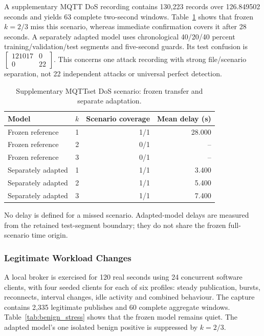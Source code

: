 \documentclass[conference]{IEEEtran}
\begin{document}
A supplementary MQTT DoS recording contains 130,223 records over
126.849502 seconds and yields 63 complete two-second windows.
Table~\ref{tab:external} shows that frozen $k=2/3$ miss this scenario,
whereas immediate confirmation covers it after 28 seconds.
A separately adapted model uses chronological 40/20/40 percent
training/validation/test segments and five-second guards. Its test
confusion is $[\begin{smallmatrix}121017&0\\0&22\end{smallmatrix}]$.
This concerns one attack recording with strong file/scenario
separation, not 22 independent attacks or universal perfect detection.

\begin{table}[t]
\centering
\caption{Supplementary MQTTset DoS scenario: frozen transfer and separate adaptation.}
\label{tab:external}
\begin{tabularx}{\textwidth}{>{\raggedright\arraybackslash}Xrrr}
\toprule
Model & $k$ & Scenario coverage & Mean delay (s) \\
\midrule
Frozen reference & 1 & 1/1 & 28.000 \\
Frozen reference & 2 & 0/1 & -- \\
Frozen reference & 3 & 0/1 & -- \\
Separately adapted & 1 & 1/1 & 3.400 \\
Separately adapted & 2 & 1/1 & 5.400 \\
Separately adapted & 3 & 1/1 & 7.400 \\
\bottomrule
\end{tabularx}
\smallskip
\parbox{\textwidth}{\footnotesize No delay is defined for a missed scenario. Adapted-model delays are measured from the retained test-segment boundary; they do not share the frozen full-scenario time origin.}
\end{table}

\subsubsection{Legitimate Workload Changes}

A local broker is exercised for 120 real seconds using 24 concurrent
software clients, with four seeded clients for each of six profiles:
steady publication, bursts, reconnects, interval changes, idle activity
and combined behaviour. The capture contains 2,335 legitimate publishes
and 60 complete aggregate windows. Table~\ref{tab:benign_stress} shows
that the frozen model remains quiet. The adapted model's one isolated
benign positive is suppressed by $k=2/3$.
\end{document}
